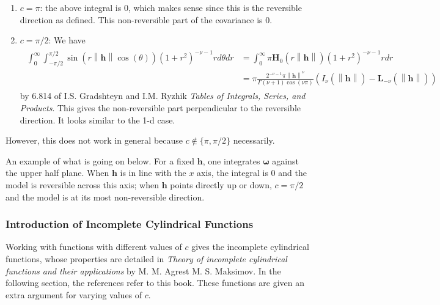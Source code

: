 \documentclass[11pt]{article}
\newcommand{\vint}{\boldsymbol{\omega}}
\begin{document}
 \begin{enumerate}
\item $c = \pi$: the above integral is $0$, which makes sense since this is the reversible direction as defined. This non-reversible part of the covariance is $0$.
\item $c = \pi/2$: We have \begin{align}
\begin{split} \int_0^\infty  \int_{-\pi/2}^{\pi/2} \sin(r\left\lVert \boldsymbol{h}\right\rVert \cos(\theta)) (1 +r^2)^{- \nu - 1} r d\theta dr&= \int_0^\infty \pi\boldsymbol{H}_0(r\left\lVert \boldsymbol{h}\right\rVert)(1 + r^2)^{-\nu - 1} r dr \\
& =\pi\frac{2^{-\nu -1} \pi \left\lVert \boldsymbol{h}\right\rVert^{\nu}}{\Gamma(\nu+1) \cos(\nu \pi)} \left( I_{\nu }(\left\lVert \boldsymbol{h}\right\rVert) - \boldsymbol{L}_{-\nu} (\left\lVert \boldsymbol{h}\right\rVert)\right)\end{split}\label{complete}
\end{align}by 6.814 of I.S. Gradshteyn and I.M. Ryzhik \textit{Tables of Integrals, Series, and Products}. This gives the non-reversible part perpendicular to the reversible direction. It looks similar to the 1-d case.
 \end{enumerate}
 
 However, this does not work in general because $c\notin \{\pi, \pi/2\}$ necessarily. 


An example of what is going on below. For a fixed $\boldsymbol{h}$, one integrates $\vint$ against the upper half plane. When $\boldsymbol{h}$ is in line with the $x$ axis, the integral is $0$ and the model is reversible across this axis; when $\boldsymbol{h}$ points directly up or down, $c= \pi/2$ and the model is at its most non-reversible direction.


\subsubsection{Introduction of Incomplete Cylindrical Functions}

Working with functions with different values of $c$ gives the incomplete cylindrical functions, whose properties are detailed in \textit{Theory of incomplete cylindrical functions and their applications} by M. M. Agrest  M. S. Maksimov. In the following section, the references refer to this book. These functions are given an extra argument for varying values of $c$.
\end{document}
